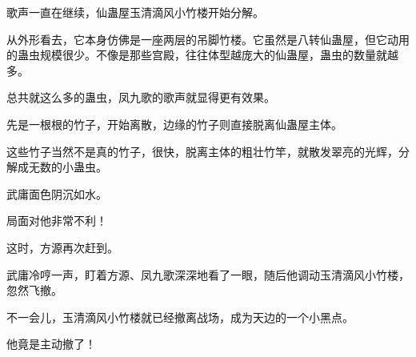 \begin{this_body}
歌声一直在继续，仙蛊屋玉清滴风小竹楼开始分解。

从外形看去，它本身仿佛是一座两层的吊脚竹楼。它虽然是八转仙蛊屋，但它动用的蛊虫规模很少。不像是那些宫殿，往往体型越庞大的仙蛊屋，蛊虫的数量就越多。

总共就这么多的蛊虫，凤九歌的歌声就显得更有效果。

先是一根根的竹子，开始离散，边缘的竹子则直接脱离仙蛊屋主体。

这些竹子当然不是真的竹子，很快，脱离主体的粗壮竹竿，就散发翠亮的光辉，分解成无数的小蛊虫。

武庸面色阴沉如水。

局面对他非常不利！

这时，方源再次赶到。

武庸冷哼一声，盯着方源、凤九歌深深地看了一眼，随后他调动玉清滴风小竹楼，忽然飞撤。

不一会儿，玉清滴风小竹楼就已经撤离战场，成为天边的一个小黑点。

他竟是主动撤了！

\end{this_body}

